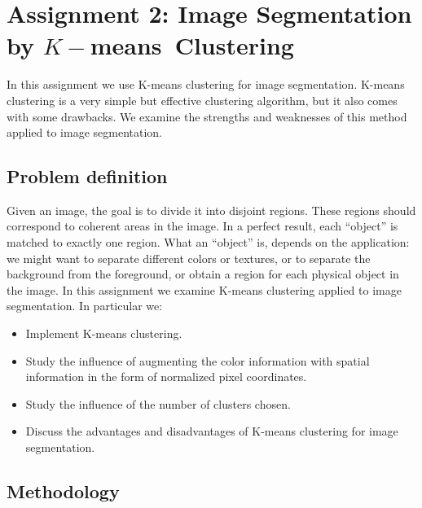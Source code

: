 \section{Assignment 2: Image Segmentation by \texorpdfstring{$K-$means}\ \ Clustering}
\label{sec:assignment2}

In this assignment we use K-means clustering for image segmentation. K-means clustering is a very simple but effective clustering algorithm, but it also comes with some drawbacks. We examine the strengths and weaknesses of this method applied to image segmentation.

\subsection{Problem definition}

Given an image, the goal is to divide it into disjoint regions. These regions should correspond to coherent areas in the image. In  a perfect result, each ``object'' is matched to exactly one region. What an ``object'' is, depends on the application: we might want to separate different colors or textures, or to separate the background from the foreground, or obtain a region for each physical object in the image. In this assignment we examine K-means clustering applied to image segmentation.
 In particular we:
\begin{itemize}[noitemsep]
	\item Implement K-means clustering.
	\item Study the influence of augmenting the color information with spatial information in the form of normalized pixel coordinates.
	\item Study the influence of the number of clusters chosen.
	\item Discuss the advantages and disadvantages of K-means clustering for image segmentation.
\end{itemize}

\subsection{Methodology}

